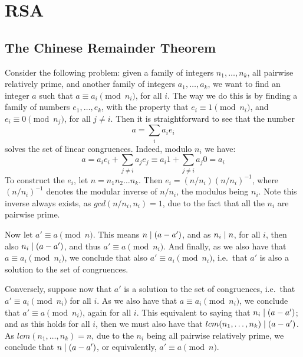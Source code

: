 
\chapter{RSA}
\label{cha:rsa}

\section{The Chinese Remainder Theorem}
  \label{sec:CRT}
  Consider the following problem: given a family of integers $n_1, \dots, n_k$, all pairwise relatively prime, and another family of integers $a_1, \dots, a_k$, we want to find an integer $a$ such that $a \equiv a_i \pmod{n_i}$, for all $i$. The way we do this is by finding a family of numbers $e_1, \dots, e_k$, with the property that $e_i \equiv 1 \pmod{n_i}$, and $e_i \equiv 0 \pmod{n_j}$, for all $j\neq i$. Then it is straightforward to see that the number
  \begin{equation}
    a = \sum_{i} a_ie_i
  \end{equation}
  solves the set of linear congruences. Indeed, modulo $n_i$ we have:
  \begin{equation}
    a = a_ie_i + \sum_{j\neq i} a_je_j \equiv a_i1 + \sum_{j\neq i} a_j0 = a_i
  \end{equation}
  To construct the $e_i$, let $n = n_1n_2\dots n_k$. Then $e_i = (n/n_i)(n/n_i)^{-1}$, where $(n/n_i)^{-1}$ denotes the modular inverse of $n/n_i$, the modulus being $n_i$. Note this inverse always exists, as $gcd(n/n_i, n_i) = 1$, due to the fact that all the $n_i$ are pairwise prime.

  Now let $a' \equiv a \pmod{n}$. This means $n\mathrel{|} (a-a')$, and as $n_i\mathrel{|} n$, for all $i$, then also $n_i\mathrel{|} (a-a')$, and thus $a' \equiv a \pmod{n_i}$. And finally, as we also have that $a \equiv a_i \pmod{n_i}$, we conclude that also $a' \equiv a_i \pmod{n_i}$, i.e.\ that $a'$ is also a solution to the set of congruences.

  Conversely, suppose now that $a'$ is a solution to the set of congruences, i.e.\ that $a' \equiv a_i \pmod{n_i}$ for all $i$. As we also have that $a \equiv a_i \pmod{n_i}$, we conclude that $a' \equiv a \pmod{n_i}$, again for all $i$. This equivalent to saying that $n_i\mathrel{|} (a-a')$; and as this holds for all $i$, then we must also have that $lcm(n_1, \dots, n_k)\mathrel{|} (a-a')$. As $lcm(n_1, \dots, n_k) = n$, due to the $n_i$ being all pairwise relatively prime, we conclude that $n\mathrel{|} (a-a')$, or equivalently, $a' \equiv a \pmod{n}$.

